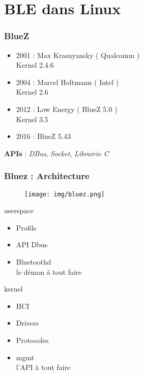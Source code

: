 \section{BLE dans Linux}

\begin{frame}
	\frametitle{BlueZ}
	\begin{itemize}
	\item 2001 : Max Krasnyansky ( Qualcomm ) \\ Kernel 2.4.6
	\item 2004 : Marcel Holtmann ( Intel )\\ Kernel 2.6
	\item 2012 : Low Energy ( BlueZ 5.0 ) \\ Kernel 3.5
\item 2016 : BlueZ 5.43
	\end{itemize}
	\textbf{APIs} : \textit{DBus}, \textit{Socket}, \textit{Librairie C}
\end{frame}

\begin{frame}
	\frametitle{Bluez : Architecture}
	\begin{minipage}{0.50\linewidth}
	\begin{figure}
		\texttt{[image: img/bluez.png]}
	\end{figure}
	\end{minipage}
	\begin{minipage}{0.32\linewidth}
		\begin{block}{userspace}
			\begin{itemize}
				\item Profils
				\item API Dbus
				\item Bluetoothd \\ {\tiny{le démon à tout faire}}
			\end{itemize}
		\end{block}
		\begin{block}{kernel}
			\begin{itemize}
				\item HCI
				\item Drivers
				\item Protocoles
				\item mgmt \\ {\small{l'API à tout faire}}
			\end{itemize}
		\end{block}
	\end{minipage}
\end{frame}

